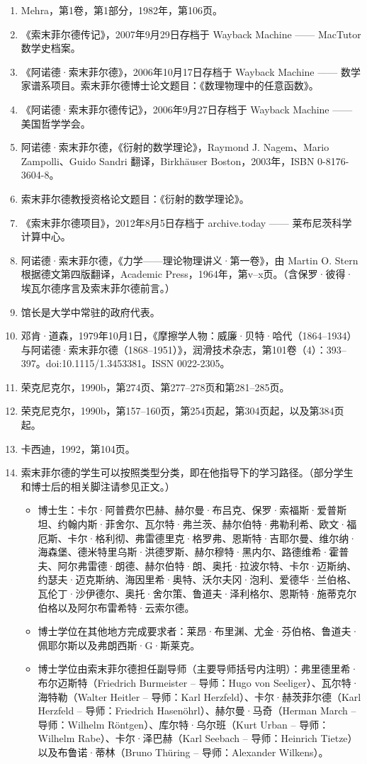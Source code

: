 \begin{enumerate}
\item Mehra，第1卷，第1部分，1982年，第106页。
\item 《索末菲尔德传记》，2007年9月29日存档于 Wayback Machine —— MacTutor 数学史档案。
\item 《阿诺德·索末菲尔德》，2006年10月17日存档于 Wayback Machine —— 数学家谱系项目。索末菲尔德博士论文题目：《数理物理中的任意函数》。
\item 《阿诺德·索末菲尔德传记》，2006年9月27日存档于 Wayback Machine —— 美国哲学学会。
\item 阿诺德·索末菲尔德，《衍射的数学理论》，Raymond J. Nagem、Mario Zampolli、Guido Sandri 翻译，Birkhäuser Boston，2003年，ISBN 0-8176-3604-8。
\item 索末菲尔德教授资格论文题目：《衍射的数学理论》。
\item 《索末菲尔德项目》，2012年8月5日存档于 archive.today —— 莱布尼茨科学计算中心。
\item 阿诺德·索末菲尔德，《力学——理论物理讲义·第一卷》，由 Martin O. Stern 根据德文第四版翻译，Academic Press，1964年，第v–x页。（含保罗·彼得·埃瓦尔德序言及索末菲尔德前言。）
\item 馆长是大学中常驻的政府代表。
\item 邓肯·道森，1979年10月1日，《摩擦学人物：威廉·贝特·哈代（1864–1934）与阿诺德·索末菲尔德（1868–1951）》，润滑技术杂志，第101卷（4）：393–397。doi:10.1115/1.3453381。ISSN 0022-2305。
\item 荣克尼克尔，1990b，第274页、第277–278页和第281–285页。
\item 荣克尼克尔，1990b，第157–160页，第254页起，第304页起，以及第384页起。
\item 卡西迪，1992，第104页。
\item 索末菲尔德的学生可以按照类型分类，即在他指导下的学习路径。（部分学生和博士后的相关脚注请参见正文。）
\begin{itemize}
\item 博士生：卡尔·阿普费尔巴赫、赫尔曼·布吕克、保罗·索福斯·爱普斯坦、约翰内斯·菲舍尔、瓦尔特·弗兰茨、赫尔伯特·弗勒利希、欧文·福厄斯、卡尔·格利彻、弗雷德里克·格罗弗、恩斯特·吉耶尔曼、维尔纳·海森堡、德米特里乌斯·洪德罗斯、赫尔穆特·黑内尔、路德维希·霍普夫、阿尔弗雷德·朗德、赫尔伯特·朗、奥托·拉波尔特、卡尔·迈斯纳、约瑟夫·迈克斯纳、海因里希·奥特、沃尔夫冈·泡利、爱德华·兰伯格、瓦伦丁·沙伊德尔、奥托·舍尔策、鲁道夫·泽利格尔、恩斯特·施蒂克尔伯格以及阿尔布雷希特·云索尔德。
\item 博士学位在其他地方完成要求者：莱昂·布里渊、尤金·芬伯格、鲁道夫·佩耶尔斯以及弗朗西斯·G·斯莱克。
\item 博士学位由索末菲尔德担任副导师（主要导师括号内注明）：弗里德里希·布尔迈斯特（Friedrich Burmeister – 导师：Hugo von Seeliger）、瓦尔特·海特勒（Walter Heitler – 导师：Karl Herzfeld）、卡尔·赫茨菲尔德（Karl Herzfeld – 导师：Friedrich Hasenöhrl）、赫尔曼·马奇（Herman March – 导师：Wilhelm Röntgen）、库尔特·乌尔班（Kurt Urban – 导师：Wilhelm Rabe）、卡尔·泽巴赫（Karl Seebach – 导师：Heinrich Tietze）以及布鲁诺·蒂林（Bruno Thüring – 导师：Alexander Wilkens）。

\end{itemize}
\end{enumerate}
